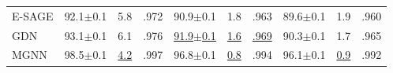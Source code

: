 \documentclass[conference]{IEEEtran}
\newcommand{\MGNN}{\textsc{MGNN}}
\begin{document}
\begin{table}[t]
{\begin{tabular}{l ccc|ccc|ccc}
E-SAGE & 92.1{\scriptsize$\pm$0.1} & 5.8 & .972 & 90.9{\scriptsize$\pm$0.1} & 1.8 & .963 & 89.6{\scriptsize$\pm$0.1} & 1.9 & .960 \\

GDN & 93.1{\scriptsize$\pm$0.1} & 6.1 & .976 & \underline{91.9{\scriptsize$\pm$0.1}} & \underline{1.6} & \underline{.969} & 90.3{\scriptsize$\pm$0.1} & 1.7 & .965 \\

\midrule
\MGNN{} & 98.5{\scriptsize$\pm$0.1} & \underline{4.2} & .997 & 96.8{\scriptsize$\pm$0.1} & \underline{0.8} & .994 & 96.1{\scriptsize$\pm$0.1} & \underline{0.9} & .992 \\

\bottomrule

\end{tabular}}%
\raggedright\footnotesize\\
\end{table}

\begin{table}[t]
\caption{Detailed results: Precision / Recall (\%). Values are mean\,$\pm$\,std over 5 runs.}
\label{tab:detail}
\centering
\scriptsize
{}%

\end{table}
\end{document}
